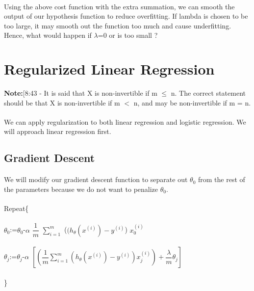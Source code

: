 \documentclass[UTF8]{ctexart}
\begin{document}
\paragraph{}
Using the above cost function with the extra summation, we can smooth the output of our hypothesis function to reduce overfitting. If lambda is chosen to be too large, it may smooth out the function too much and cause underfitting. Hence, what would happen if $\lambda$=0 or is too small ?
\newpage
\section{Regularized Linear Regression}
\paragraph{}
\textbf{Note:}[8:43 - It is said that X is non-invertible if m $\leq$ n. The correct statement should be that X is non-invertible if m $<$ n, and may be non-invertible if m = n.
\paragraph{}
We can apply regularization to both linear regression and logistic regression. We will approach linear regression first.
\subsection{Gradient Descent}
\paragraph{}
We will modify our gradient descent function to separate out $\theta_{0}$ from the rest of the parameters because we do not want to penalize $\theta_{0}$.
\paragraph{}
\begin{algorithm}
\paragraph{}
Repeat\{
\paragraph{}
$\theta_{0}$:=$\theta_{0}$-$\alpha$ $\dfrac{1}{m}$ $\sum_{i=1}^m$ ($(h_{\theta}(x^{(i)})-y^{(i)}$) $x_{0}^{(i)}$
\paragraph{}
$\theta_{j}$:=$\theta_{j}$-$\alpha$ $\left[ \left( \dfrac{1}{m} \sum_{i=1}^m (h_{\theta}(x^{(i)})-y^{(i)}) x_{j}^{(i)} \right) +\dfrac{\lambda}{m} \theta_{j}\right]$
\paragraph{}
\}
\end{algorithm}
\end{document}
